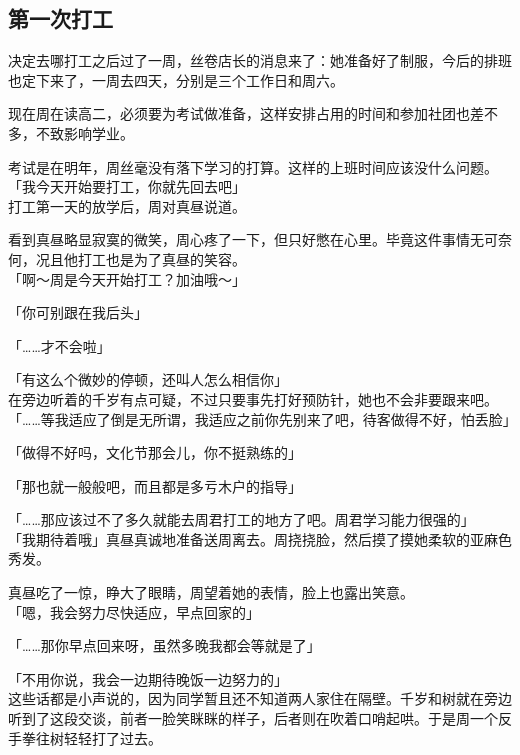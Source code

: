 \subsection{第一次打工}

决定去哪打工之后过了一周，丝卷店长的消息来了：她准备好了制服，今后的排班也定下来了，一周去四天，分别是三个工作日和周六。

现在周在读高二，必须要为考试做准备，这样安排占用的时间和参加社团也差不多，不致影响学业。

考试是在明年，周丝毫没有落下学习的打算。这样的上班时间应该没什么问题。\\

「我今天开始要打工，你就先回去吧」\\

打工第一天的放学后，周对真昼说道。

看到真昼略显寂寞的微笑，周心疼了一下，但只好憋在心里。毕竟这件事情无可奈何，况且他打工也是为了真昼的笑容。\\

「啊～周是今天开始打工？加油哦～」

「你可别跟在我后头」

「……才不会啦」

「有这么个微妙的停顿，还叫人怎么相信你」\\

在旁边听着的千岁有点可疑，不过只要事先打好预防针，她也不会非要跟来吧。\\

「……等我适应了倒是无所谓，我适应之前你先别来了吧，待客做得不好，怕丢脸」

「做得不好吗，文化节那会儿，你不挺熟练的」

「那也就一般般吧，而且都是多亏木户的指导」

「……那应该过不了多久就能去周君打工的地方了吧。周君学习能力很强的」\\

「我期待着哦」真昼真诚地准备送周离去。周挠挠脸，然后摸了摸她柔软的亚麻色秀发。

真昼吃了一惊，睁大了眼睛，周望着她的表情，脸上也露出笑意。\\

「嗯，我会努力尽快适应，早点回家的」

「……那你早点回来呀，虽然多晚我都会等就是了」

「不用你说，我会一边期待晚饭一边努力的」\\

这些话都是小声说的，因为同学暂且还不知道两人家住在隔壁。千岁和树就在旁边听到了这段交谈，前者一脸笑眯眯的样子，后者则在吹着口哨起哄。于是周一个反手拳往树轻轻打了过去。

